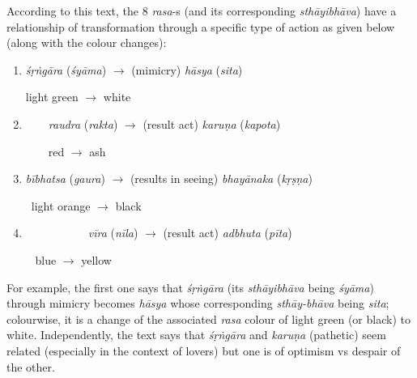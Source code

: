 According to this text, the 8 \textsl{rasa}-s (and its corresponding \textsl{sthāyibhāva}) have a relationship of transformation through a specific type of action as given below (along with the colour changes):
\begin{enumerate}
\item \textsl{śṛṅgāra} (\textsl{śyāma}) $\to$ (mimicry) \textsl{hāsya}
 (\textsl{sita}) 
 
\qquad\!\!\! light green $\to$ white

\item~~~~\textsl{raudra} (\textsl{rakta}) $\to$ (result act) \textsl{karuṇa} (\textsl{kapota}) 

~~~~\qquad\qquad red $\to$ ash

\item \textsl{bībhatsa} (\textsl{gaura}) $\to$ (results in seeing) \textsl{bhayānaka} (\textsl{kṛṣṇa}) 

\quad~light orange $\to$ black

\item~~~~~~~~~~~\textsl{vīra} (\textsl{nīla}) $\to$ (result act) \textsl{adbhuta}
 (\textsl{pīta}) 
 
\qquad\qquad~ blue $\to$ yellow 
\end{enumerate}

For example, the first one says that \textsl{śṛṅgāra} (its \textsl{sthāyibhāva} being \textsl{śyāma}) through mimicry becomes \textsl{hāsya} whose corresponding \textsl{sthāy-bhāva} being \textsl{sita}; colourwise, it is a change of the associated \textsl{rasa} colour of light green (or black) to white. Independently, the text says that \textsl{śṛṅgāra} and \textsl{karuṇa} (pathetic) seem related (especially in the context of lovers) but one is of optimism vs despair of the other.


